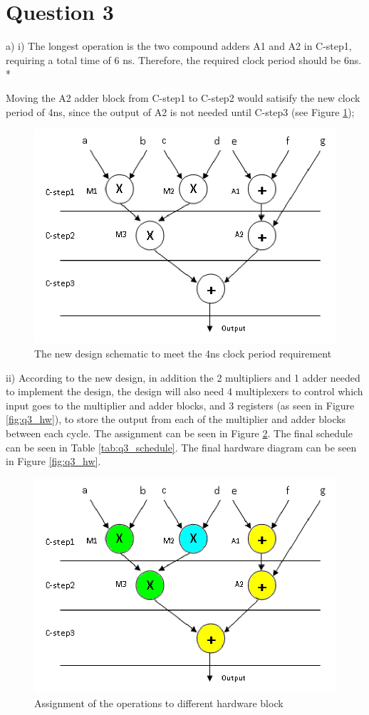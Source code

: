 \documentclass[11pt]{article}
\begin{document}
\section*{Question 3}
a)
i)
The longest operation is the two compound adders A1 and A2 in C-step1, requiring a total time of 6 ns. Therefore, the required clock period should be 6ns.\\*

Moving the A2 adder block from C-step1 to C-step2 would satisify the new clock period of 4ns, since the output of A2 is not needed until C-step3 (see Figure \ref{fig:q3_design});

\begin{figure}[h!]
  \centering
  \includegraphics[width=0.8\linewidth]{q3/q3_design.png}
  \caption{The new design schematic to meet the 4ns clock period requirement}
  \label{fig:q3_design}
\end{figure}

ii)
According to the new design, in addition the 2 multipliers and 1 adder needed to implement the design, the design will also need 4 multiplexers to control which input goes to the multiplier and adder blocks, and 3 registers (as seen in Figure \ref{fig:q3_hw}), to store the output from each of the multiplier and adder blocks between each cycle. The assignment can be seen in Figure \ref{fig:q3_assign}. The final schedule can be seen in Table \ref{tab:q3_schedule}. The final hardware diagram can be seen in Figure \ref{fig:q3_hw}.

\begin{figure}[h!]
  \centering
  \includegraphics[width=0.8\linewidth]{q3/q3_design2.png}
  \caption{Assignment of the operations to different hardware block}
  \label{fig:q3_assign}
\end{figure}
\end{document}
